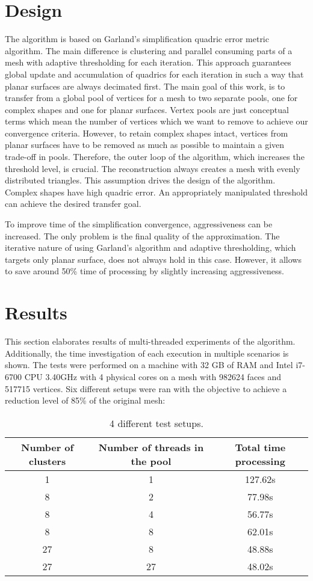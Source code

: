 \newpage
\section{Design}

The algorithm is based on Garland's simplification quadric error metric algorithm. The main difference is clustering and parallel consuming parts of a mesh with adaptive thresholding for each iteration. This approach guarantees global update and accumulation of quadrics for each iteration in such a way that planar surfaces are always decimated first. The main goal of this work, is to transfer from a global pool of vertices for a mesh to two separate pools, one for complex shapes and one for planar surfaces. Vertex pools are just conceptual terms which mean the number of vertices which we want to remove to achieve our convergence criteria. However, to retain complex shapes intact, vertices from planar surfaces have to be removed as much as possible to maintain a given trade-off in pools. Therefore, the outer loop of the algorithm, which increases the threshold level, is crucial. The reconstruction always creates a mesh with evenly distributed triangles. This assumption drives the design of the algorithm. Complex shapes have high quadric error. An appropriately manipulated threshold can achieve the desired transfer goal.

To improve time of the simplification convergence, aggressiveness can be increased. The only problem is the final quality of the approximation. The iterative nature of using Garland's algorithm and adaptive thresholding, which targets only planar surface, does not always hold in this case. However, it allows to save around 50\% time of processing by slightly increasing aggressiveness.

\newpage
\section{Results}

This section elaborates results of multi-threaded experiments of the algorithm. Additionally, the time investigation of each execution in multiple scenarios is shown. The tests were performed on a machine with 32 GB of RAM and Intel i7-6700 CPU 3.40GHz with 4 physical cores on a mesh with 982624 faces and 517715 vertices. Six different setups were ran with the objective to achieve a reduction level of 85\% of the original mesh:

\begin{table}[h!]
\centering
\begin{tabular}{ |c|c|c| } 
 \hline
 Number of clusters & Number of threads in the pool & Total time processing\\
 \hline
 1 & 1 & 127.62s\\
 8 & 2 & 77.98s\\
 8 & 4 & 56.77s\\
 8 & 8 & 62.01s\\
 27 & 8 & 48.88s\\
 27 & 27 & 48.02s\\
 \hline
\end{tabular}
\caption{4 different test setups.}
\end{table}


